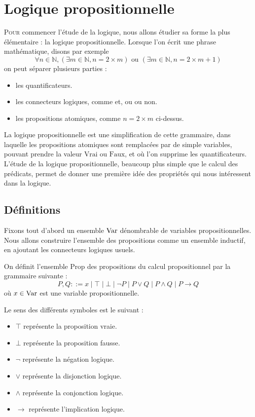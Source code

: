 \chapter{Logique propositionnelle}
\label{chp.logprop}

\minitoc

\lettrine{P}{our} commencer l'étude de la logique, nous allons étudier sa forme
la plus élémentaire : la logique propositionnelle. Lorsque l'on écrit une phrase
mathématique, disons par exemple
\[\forall n \in \mathbb N, (\exists m \in \mathbb N, n = 2\times m) \text{ ou }
(\exists m \in \mathbb N, n = 2 \times m + 1)\]
on peut séparer plusieurs parties :
\begin{itemize}
\item les quantificateurs.
\item les connecteurs logiques, comme \og et\fg{}, \og ou\fg{} ou \og non\fg{}.
\item les propositions atomiques, comme $n = 2 \times m$ ci-dessus.
\end{itemize}

La logique propositionnelle est une simplification de cette grammaire, dans
laquelle les propositions atomiques sont remplacées par de simple variables,
pouvant prendre la valeur $\mathrm{Vrai}$ ou $\mathrm{Faux}$, et où l'on
supprime les quantificateurs. L'étude de la logique propositionnelle, beaucoup
plus simple que le calcul des prédicats, permet de donner une première idée des
propriétés qui nous intéressent dans la logique.

\section{Définitions}

Fixons tout d'abord un ensemble $\operatorname{Var}$ dénombrable de variables
propositionnelles. Nous allons construire l'ensemble des propositions comme un
ensemble inductif, en ajoutant les connecteurs logiques usuels.

\begin{definition}[Propositions]
  On définit l'ensemble $\mathrm{Prop}$ des propositions du calcul
  propositionnel par la grammaire suivante :
  \[P,Q ::= x \mid \top \mid \bot \mid \lnot P \mid P \lor Q \mid P \land Q
  \mid P \to Q\]
  où $x\in \operatorname{Var}$ est une variable propositionnelle.
\end{definition}

Le sens des différents symboles est le suivant :
\begin{itemize}
\item $\top$ représente la proposition vraie.
\item $\bot$ représente la proposition fausse.
\item $\lnot$ représente la négation logique.
\item $\lor$ représente la disjonction logique.
\item $\land$ représente la conjonction logique.
\item $\to$ représente l'implication logique.
\end{itemize}

